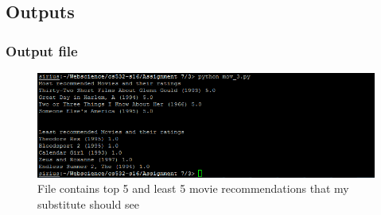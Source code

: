 \subsection{Outputs}
\subsubsection{Output file}
\begin{figure}[ht]    
    \begin{center}
        \includegraphics[scale=0.8]{q3_output.png}
        \caption{File contains top 5 and least 5 movie recommendations that my substitute should see}
        \label{Sample3t3}
    \end{center}
\end{figure}
\newpage
